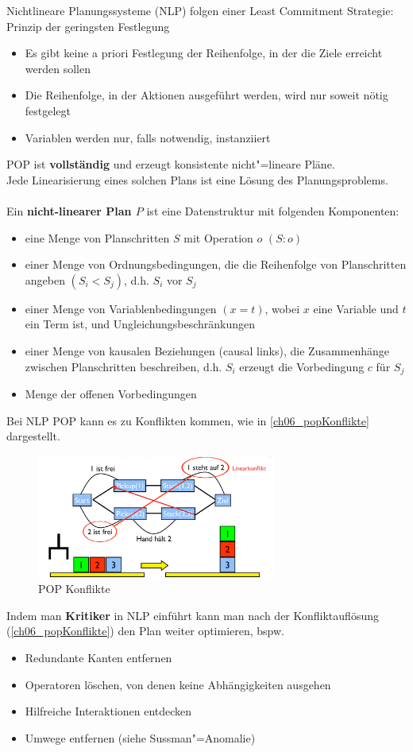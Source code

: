 Nichtlineare Planungssysteme (NLP) folgen einer Least Commitment Strategie: \glqq Prinzip der geringsten Festlegung\grqq{}
\begin{itemize}
\item Es gibt keine a priori Festlegung der Reihenfolge, in der die Ziele erreicht werden sollen
\item Die Reihenfolge, in der Aktionen ausgeführt werden, wird nur soweit nötig festgelegt
\item Variablen werden nur, falls notwendig, instanziiert
\end{itemize}
POP ist \textbf{vollständig} und erzeugt konsistente nicht"=lineare Pläne.\\
Jede Linearisierung eines solchen Plans ist eine Lösung des Planungsproblems.\\ \\
Ein \textbf{nicht-linearer Plan $P$} ist eine Datenstruktur mit folgenden Komponenten:
\begin{itemize}
\item eine Menge von Planschritten $S$ mit Operation $o$ $(S:o)$
\item einer Menge von Ordnungsbedingungen, die die Reihenfolge von Planschritten angeben $(S_i < S_j)$, d.h. \glqq $S_i$ vor $S_j$\grqq
\item einer Menge von Variablenbedingungen $(x=t)$, wobei $x$ eine Variable und $t$ ein Term ist, und Ungleichungsbeschränkungen
\item einer Menge von kausalen Beziehungen (causal links), die Zusammenhänge zwischen Planschritten beschreiben, d.h. $S_i$ erzeugt die Vorbedingung $c$ für $S_j$
\item Menge der offenen Vorbedingungen
\end{itemize}
Bei NLP POP kann es zu Konflikten kommen, wie in \autoref{ch06_popKonflikte} dargestellt.
\begin{figure}[ht]\centering 
\includegraphics[width=0.7\textwidth]{figures/ch06_popKonflikte.png}
\caption{POP Konflikte}
\label{ch06_popKonflikte}
\end{figure}
Indem man \textbf{Kritiker} in NLP einführt kann man nach der Konfliktauflösung (\autoref{ch06_popKonflikte}) den Plan weiter optimieren, bspw.\
\begin{itemize}
	\item Redundante Kanten entfernen
	\item Operatoren löschen, von denen keine Abhängigkeiten ausgehen
	\item Hilfreiche Interaktionen entdecken
	\item Umwege entfernen (siehe Sussman"=Anomalie)
\end{itemize}

